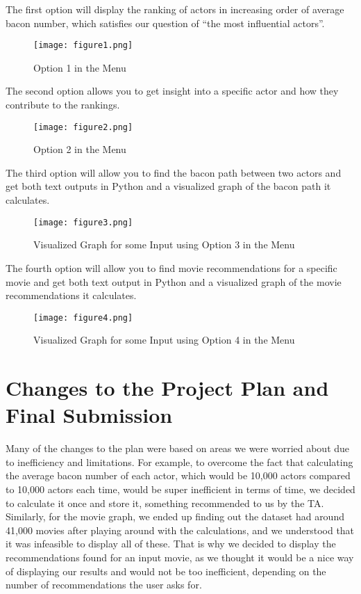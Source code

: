\documentclass{article}
\begin{document}
The first option will display the ranking of actors in increasing order of average bacon number, which satisfies our question of “the most influential actors”.
\begin{figure}[h!tbp]
    \centering
    \texttt{[image: figure1.png]}
    \caption{Option 1 in the Menu}
\end{figure}

The second option allows you to get insight into a specific actor and how they contribute to the rankings.
\begin{figure}[h!tbp]
    \centering
    \texttt{[image: figure2.png]}
    \caption{Option 2 in the Menu}
\end{figure}

The third option will allow you to find the bacon path between two actors and get both text outputs in Python and a visualized graph of the bacon path it calculates.
\begin{figure}[h!tbp]
    \centering
    \texttt{[image: figure3.png]}
    \caption{Visualized Graph for some Input using Option 3 in the Menu}
\end{figure}

The fourth option will allow you to find movie recommendations for a specific movie and get both text output in Python and a visualized graph of the movie recommendations it calculates.
\begin{figure}[h!tbp]
    \centering
    \texttt{[image: figure4.png]}
    \caption{Visualized Graph for some Input using Option 4 in the Menu}
\end{figure}

\section*{Changes to the Project Plan and Final Submission}
Many of the changes to the plan were based on areas we were worried about due to inefficiency and limitations. For example, to overcome the fact that calculating the average bacon number of each actor, which would be 10,000 actors compared to 10,000 actors each time, would be super inefficient in terms of time, we decided to calculate it once and store it, something recommended to us by the TA. \\

Similarly, for the movie graph, we ended up finding out the dataset had around 41,000 movies after playing around with the calculations, and we understood that it was infeasible to display all of these. That is why we decided to display the recommendations found for an input movie, as we thought it would be a nice way of displaying our results and would not be too inefficient, depending on the number of recommendations the user asks for. \\
\end{document}

